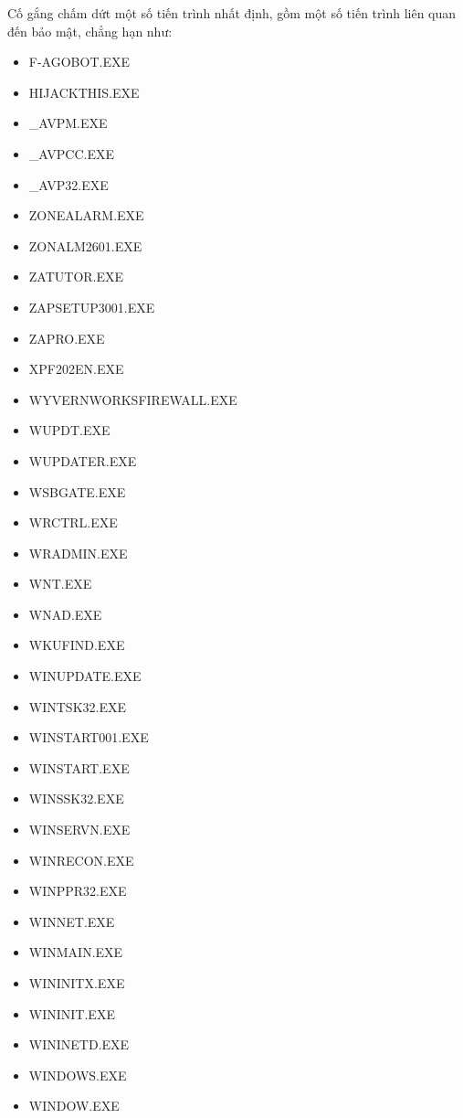 
Cố gắng chấm dứt một số tiến trình nhất định, gồm một số tiến trình liên quan đến bảo mật, chẳng hạn như:

\begin{itemize}
\item F-AGOBOT.EXE
\item HIJACKTHIS.EXE
\item \_AVPM.EXE
\item \_AVPCC.EXE
\item \_AVP32.EXE
\item ZONEALARM.EXE
\item ZONALM2601.EXE
\item ZATUTOR.EXE
\item ZAPSETUP3001.EXE
\item ZAPRO.EXE
\item XPF202EN.EXE
\item WYVERNWORKSFIREWALL.EXE
\item WUPDT.EXE
\item WUPDATER.EXE
\item WSBGATE.EXE
\item WRCTRL.EXE
\item WRADMIN.EXE
\item WNT.EXE
\item WNAD.EXE
\item WKUFIND.EXE
\item WINUPDATE.EXE
\item WINTSK32.EXE
\item WINSTART001.EXE
\item WINSTART.EXE
\item WINSSK32.EXE
\item WINSERVN.EXE
\item WINRECON.EXE
\item WINPPR32.EXE
\item WINNET.EXE
\item WINMAIN.EXE
\item WININITX.EXE
\item WININIT.EXE
\item WININETD.EXE
\item WINDOWS.EXE
\item WINDOW.EXE

\end{itemize}

